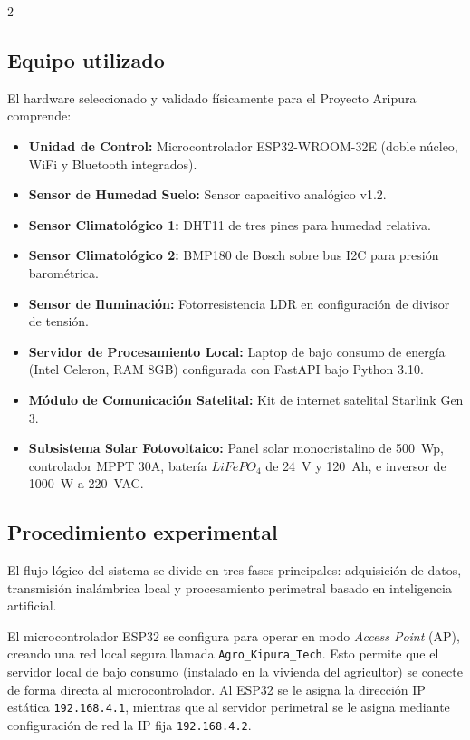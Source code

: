 \documentclass[a4paper, 11pt]{article}
\begin{document}
\begin{multicols}{2}
\subsection{Equipo utilizado}
El hardware seleccionado y validado físicamente para el Proyecto Aripura comprende:
\begin{itemize}
    \item \textbf{Unidad de Control:} Microcontrolador ESP32-WROOM-32E (doble núcleo, WiFi y Bluetooth integrados).
    \item \textbf{Sensor de Humedad Suelo:} Sensor capacitivo analógico v1.2.
    \item \textbf{Sensor Climatológico 1:} DHT11 de tres pines para humedad relativa.
    \item \textbf{Sensor Climatológico 2:} BMP180 de Bosch sobre bus I2C para presión barométrica.
    \item \textbf{Sensor de Iluminación:} Fotorresistencia LDR en configuración de divisor de tensión.
    \item \textbf{Servidor de Procesamiento Local:} Laptop de bajo consumo de energía (Intel Celeron, RAM 8GB) configurada con FastAPI bajo Python 3.10.
    \item \textbf{Módulo de Comunicación Satelital:} Kit de internet satelital Starlink Gen 3.
    \item \textbf{Subsistema Solar Fotovoltaico:} Panel solar monocristalino de \SI{500}{Wp}, controlador MPPT 30A, batería $LiFePO_4$ de \SI{24}{V} y \SI{120}{Ah}, e inversor de \SI{1000}{W} a \SI{220}{VAC}.
\end{itemize}

\subsection{Procedimiento experimental}
El flujo lógico del sistema se divide en tres fases principales: adquisición de datos, transmisión inalámbrica local y procesamiento perimetral basado en inteligencia artificial.

El microcontrolador ESP32 se configura para operar en modo \textit{Access Point} (AP), creando una red local segura llamada \texttt{Agro\_Kipura\_Tech}. Esto permite que el servidor local de bajo consumo (instalado en la vivienda del agricultor) se conecte de forma directa al microcontrolador. Al ESP32 se le asigna la dirección IP estática \texttt{192.168.4.1}, mientras que al servidor perimetral se le asigna mediante configuración de red la IP fija \texttt{192.168.4.2}.


\end{multicols}
\end{document}
